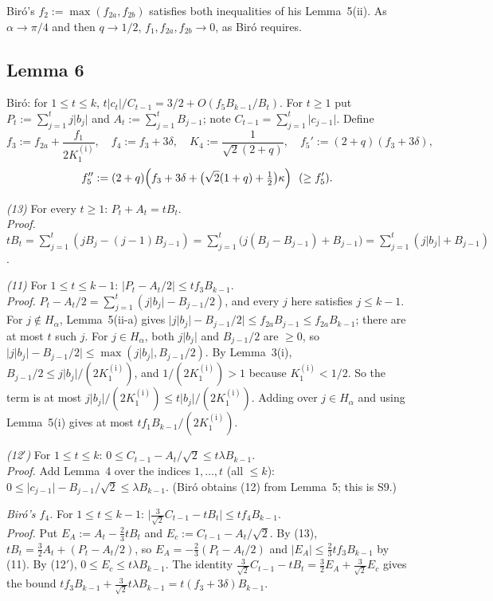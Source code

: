 \documentclass[11pt]{amsart}
\theoremstyle{remark}
\theoremstyle{plain}
\newcommand{\abs}[1]{\lvert #1\rvert}
\newcommand{\Ka}{K_1^{(\mathrm{i})}}
\begin{document}
Bir\'o's $f_2:=\max(f_{2a},f_{2b})$ satisfies both inequalities of his Lemma~5(ii). As $\alpha\to\pi/4$ and then $q\to1/2$, $f_1,f_{2a},f_{2b}\to0$, as Bir\'o requires.

\subsection{Lemma 6}\label{app:lemma6}
Bir\'o: for $1\le t\le k$, $t\abs{c_t}/C_{t-1}=3/2+O(f_5B_{k-1}/B_t)$. For $t\ge1$ put $P_t:=\sum_{j=1}^tj\abs{b_j}$ and $A_t:=\sum_{j=1}^tB_{j-1}$; note $C_{t-1}=\sum_{j=1}^t\abs{c_{j-1}}$. Define
\[
f_3:=f_{2a}+\frac{f_1}{2\Ka},\quad f_4:=f_3+3\delta,\quad K_4:=\frac1{\sqrt2(2+q)},\quad f_5':=(2+q)(f_3+3\delta),
\]
\[
f_5'':=(2+q)\Bigl(f_3+3\delta+\bigl(\sqrt2(1+q)+\tfrac12\bigr)\kappa\Bigr)\ \ (\ge f_5').
\]

\emph{(13)} For every $t\ge1$: $P_t+A_t=tB_t$. \\
\emph{Proof.} $tB_t=\sum_{j=1}^t(jB_j-(j-1)B_{j-1})=\sum_{j=1}^t\bigl(j(B_j-B_{j-1})+B_{j-1}\bigr)=\sum_{j=1}^t(j\abs{b_j}+B_{j-1})$.

\emph{(11)} For $1\le t\le k-1$: $\abs{P_t-A_t/2}\le tf_3B_{k-1}$. \\
\emph{Proof.} $P_t-A_t/2=\sum_{j=1}^t(j\abs{b_j}-B_{j-1}/2)$, and every $j$ here satisfies $j\le k-1$. For $j\notin H_\alpha$, Lemma~5(ii-a) gives $\abs{j\abs{b_j}-B_{j-1}/2}\le f_{2a}B_{j-1}\le f_{2a}B_{k-1}$; there are at most $t$ such $j$. For $j\in H_\alpha$, both $j\abs{b_j}$ and $B_{j-1}/2$ are $\ge0$, so $\abs{j\abs{b_j}-B_{j-1}/2}\le\max(j\abs{b_j},B_{j-1}/2)$. By Lemma~3(i), $B_{j-1}/2\le j\abs{b_j}/(2\Ka)$, and $1/(2\Ka)>1$ because $\Ka<1/2$. So the term is at most $j\abs{b_j}/(2\Ka)\le t\abs{b_j}/(2\Ka)$. Adding over $j\in H_\alpha$ and using Lemma~5(i) gives at most $tf_1B_{k-1}/(2\Ka)$.

\emph{(12$'$)} For $1\le t\le k$: $0\le C_{t-1}-A_t/\sqrt2\le t\lambda B_{k-1}$. \\
\emph{Proof.} Add Lemma~4 over the indices $1,\dots,t$ (all $\le k$): $0\le\abs{c_{j-1}}-B_{j-1}/\sqrt2\le\lambda B_{k-1}$. (Bir\'o obtains (12) from Lemma~5; this is S9.)

\emph{Bir\'o's $f_4$.} For $1\le t\le k-1$: $\bigl|\frac3{\sqrt2}C_{t-1}-tB_t\bigr|\le tf_4B_{k-1}$. \\
\emph{Proof.} Put $E_A:=A_t-\frac23tB_t$ and $E_c:=C_{t-1}-A_t/\sqrt2$. By (13), $tB_t=\frac32A_t+(P_t-A_t/2)$, so $E_A=-\frac23(P_t-A_t/2)$ and $\abs{E_A}\le\frac23tf_3B_{k-1}$ by (11). By (12$'$), $0\le E_c\le t\lambda B_{k-1}$. The identity $\frac3{\sqrt2}C_{t-1}-tB_t=\frac32E_A+\frac3{\sqrt2}E_c$ gives the bound $tf_3B_{k-1}+\frac3{\sqrt2}t\lambda B_{k-1}=t(f_3+3\delta)B_{k-1}$.
\end{document}
